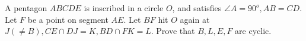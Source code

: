 A pentagon $ABCDE$ is inscribed in a circle $O$, and satisfies $\angle A = 90^o, AB = CD$. Let $F$ be a point on segment $AE$. Let $BF$ hit $O$ again at $J(\ne B), CE \cap DJ = K, BD\cap FK = L$. Prove that $B,L,E,F$ are cyclic.
